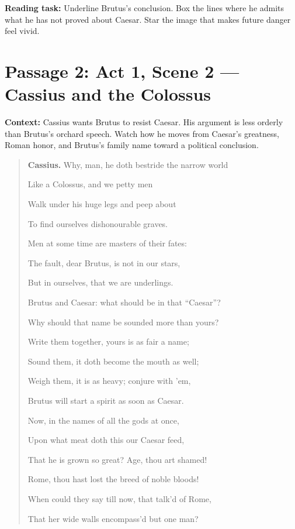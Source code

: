\documentclass[12pt]{article}
\newenvironment{playpassage}{\begin{quote}\small\setlength{\parskip}{0.25em}}{\end{quote}}
\newcommand{\speaker}[1]{\textbf{#1.}}
\begin{document}
\textbf{Reading task:} Underline Brutus's conclusion. Box the lines where he admits what he has not proved about Caesar. Star the image that makes future danger feel vivid.

\newpage

\section*{Passage 2: Act 1, Scene 2 --- Cassius and the Colossus}

\textbf{Context:} Cassius wants Brutus to resist Caesar. His argument is less orderly than Brutus's orchard speech. Watch how he moves from Caesar's greatness, Roman honor, and Brutus's family name toward a political conclusion.

\begin{playpassage}
\speaker{Cassius} Why, man, he doth bestride the narrow world\par
Like a Colossus, and we petty men\par
Walk under his huge legs and peep about\par
To find ourselves dishonourable graves.\par
Men at some time are masters of their fates:\par
The fault, dear Brutus, is not in our stars,\par
But in ourselves, that we are underlings.\par
Brutus and Caesar: what should be in that ``Caesar''?\par
Why should that name be sounded more than yours?\par
Write them together, yours is as fair a name;\par
Sound them, it doth become the mouth as well;\par
Weigh them, it is as heavy; conjure with 'em,\par
Brutus will start a spirit as soon as Caesar.\par
Now, in the names of all the gods at once,\par
Upon what meat doth this our Caesar feed,\par
That he is grown so great? Age, thou art shamed!\par
Rome, thou hast lost the breed of noble bloods!\par
When could they say till now, that talk'd of Rome,\par
That her wide walls encompass'd but one man?
\end{playpassage}
\end{document}
